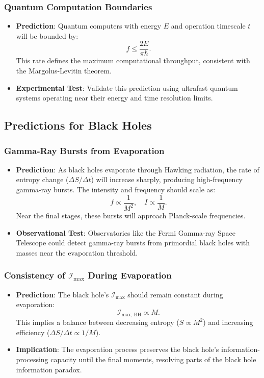 \documentclass[12pt]{article}
\begin{document}
\subsubsection{Quantum Computation Boundaries}
\begin{itemize}
    \item \textbf{Prediction}: Quantum computers with energy \( E \) and operation timescale \( t \) will be bounded by:
    \[
    f \leq \frac{2E}{\pi \hbar}.
    \]
    This rate defines the maximum computational throughput, consistent with the Margolus-Levitin theorem.
    \item \textbf{Experimental Test}: Validate this prediction using ultrafast quantum systems operating near their energy and time resolution limits.
\end{itemize}

\subsection{Predictions for Black Holes}
\subsubsection{Gamma-Ray Bursts from Evaporation}
\begin{itemize}
    \item \textbf{Prediction}: As black holes evaporate through Hawking radiation, the rate of entropy change (\( \Delta S / \Delta t \)) will increase sharply, producing high-frequency gamma-ray bursts. The intensity and frequency should scale as:
    \[
    f \propto \frac{1}{M^2}, \quad I \propto \frac{1}{M}.
    \]
    Near the final stages, these bursts will approach Planck-scale frequencies.
    \item \textbf{Observational Test}: Observatories like the Fermi Gamma-ray Space Telescope could detect gamma-ray bursts from primordial black holes with masses near the evaporation threshold.
\end{itemize}

\subsubsection{Consistency of \( \mathcal{I}_{\text{max}} \) During Evaporation}
\begin{itemize}
    \item \textbf{Prediction}: The black hole’s \( \mathcal{I}_{\text{max}} \) should remain constant during evaporation:
    \[
    \mathcal{I}_{\text{max, BH}} \propto M.
    \]
    This implies a balance between decreasing entropy (\( S \propto M^2 \)) and increasing efficiency (\( \Delta S / \Delta t \propto 1/M \)).
    \item \textbf{Implication}: The evaporation process preserves the black hole’s information-processing capacity until the final moments, resolving parts of the black hole information paradox.
\end{itemize}
\end{document}
